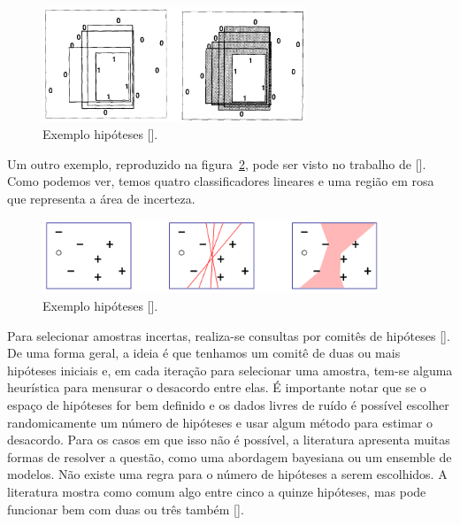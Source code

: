 \begin{figure}
  \centering
  \includegraphics[width=0.7\textwidth]{figures/cohn_1994_hypothesis_space_example.png}
  \caption{Exemplo  hipóteses [\cite{cohn1994improving}].}
  \label{fig:cohn_1994_hypothesis_space_example}
\end{figure}

Um outro exemplo, reproduzido na figura~\ref{fig:dasgupta_two_faces_hypothesis_example}, pode ser visto no trabalho de [\cite{dasgupta2011two}]. Como podemos ver, temos quatro classificadores lineares e uma região em rosa que representa a área de incerteza. 

\begin{figure}
  \centering
  \includegraphics[width=0.9\textwidth]{figures/dasgupta_two_faces_hypothesis_example.png}
  \caption{Exemplo  hipóteses [\cite{dasgupta2011two}].}
  \label{fig:dasgupta_two_faces_hypothesis_example}
\end{figure}


Para selecionar amostras incertas, realiza-se consultas por comitês de hipóteses [\cite{seung1992query}]. De uma forma geral, a ideia é que tenhamos um comitê de duas ou mais hipóteses iniciais e, em cada iteração para selecionar uma amostra, tem-se alguma heurística para mensurar o desacordo entre elas.  É importante notar que se o espaço de hipóteses for bem definido e os dados livres de ruído é possível escolher randomicamente um número de hipóteses e usar algum método para estimar o desacordo. Para os casos em que isso não é possível, a literatura apresenta muitas formas de resolver a questão, como uma abordagem bayesiana ou um ensemble de modelos. Não existe uma regra para o número de hipóteses a serem escolhidos. A literatura mostra como comum algo entre cinco a quinze hipóteses, mas pode funcionar bem com duas ou três também [\cite{settles2014active}]. 


